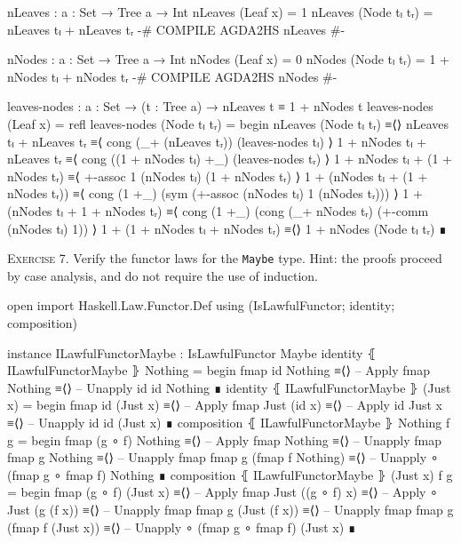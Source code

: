 \documentclass{article}
\begin{document}
\begin{code}
nLeaves : {a : Set} → Tree a → Int
nLeaves (Leaf x) = 1
nLeaves (Node tₗ tᵣ) = nLeaves tₗ + nLeaves tᵣ
{-# COMPILE AGDA2HS nLeaves #-}

nNodes : {a : Set} → Tree a → Int
nNodes (Leaf x) = 0
nNodes (Node tₗ tᵣ) = 1 + nNodes tₗ + nNodes tᵣ
{-# COMPILE AGDA2HS nNodes #-}

leaves-nodes : {a : Set} → (t : Tree a)
    → nLeaves t ≡ 1 + nNodes t
leaves-nodes (Leaf x) = refl
leaves-nodes (Node tₗ tᵣ) =
  begin
    nLeaves (Node tₗ tᵣ)
  ≡⟨⟩
    nLeaves tₗ + nLeaves tᵣ
  ≡⟨ cong (_+ (nLeaves tᵣ)) (leaves-nodes tₗ) ⟩
    1 + nNodes tₗ + nLeaves tᵣ
  ≡⟨ cong ((1 + nNodes tₗ) +_) (leaves-nodes tᵣ) ⟩
    1 + nNodes tₗ + (1 + nNodes tᵣ)
  ≡⟨ +-assoc 1 (nNodes tₗ) (1 + nNodes tᵣ) ⟩
    1 + (nNodes tₗ + (1 + nNodes tᵣ))
  ≡⟨ cong (1 +_) (sym (+-assoc (nNodes tₗ) 1 (nNodes tᵣ))) ⟩
    1 + (nNodes tₗ + 1 + nNodes tᵣ)
  ≡⟨ cong (1 +_) (cong (_+ nNodes tᵣ) (+-comm (nNodes tₗ) 1)) ⟩
    1 + (1 + nNodes tₗ + nNodes tᵣ)
  ≡⟨⟩
    1 + nNodes (Node tₗ tᵣ)
  ∎
\end{code}

\noindent
\textsc{Exercise 7.} Verify the functor laws for the \texttt{Maybe} type. Hint: the proofs proceed by case analysis, and do not require the use of induction.

\begin{code}
open import Haskell.Law.Functor.Def
  using (IsLawfulFunctor; identity; composition)

instance
  ILawfulFunctorMaybe : IsLawfulFunctor Maybe
  identity ⦃ ILawfulFunctorMaybe ⦄ Nothing =
    begin
      fmap id Nothing
    ≡⟨⟩ -- Apply fmap
      Nothing
    ≡⟨⟩ -- Unapply id
      id Nothing
    ∎
  identity ⦃ ILawfulFunctorMaybe ⦄ (Just x) =
    begin
      fmap id (Just x)
    ≡⟨⟩ -- Apply fmap
      Just (id x)
    ≡⟨⟩ -- Apply id
      Just x
    ≡⟨⟩ -- Unapply id
      id (Just x)
    ∎
  composition ⦃ ILawfulFunctorMaybe ⦄ Nothing f g =
    begin
      fmap (g ∘ f) Nothing
    ≡⟨⟩ -- Apply fmap
      Nothing
    ≡⟨⟩ -- Unapply fmap
      fmap g Nothing
    ≡⟨⟩ -- Unapply fmap
      fmap g (fmap f Nothing)
    ≡⟨⟩ -- Unapply ∘
      (fmap g ∘ fmap f) Nothing
    ∎
  composition ⦃ ILawfulFunctorMaybe ⦄ (Just x) f g =
    begin
      fmap (g ∘ f) (Just x)
    ≡⟨⟩ -- Apply fmap
      Just ((g ∘ f) x)
    ≡⟨⟩ -- Apply ∘
      Just (g (f x))
    ≡⟨⟩ -- Unapply fmap
      fmap g (Just (f x))
    ≡⟨⟩ -- Unapply fmap
      fmap g (fmap f (Just x))
    ≡⟨⟩ -- Unapply ∘
      (fmap g ∘ fmap f) (Just x)
    ∎
\end{code}
\end{document}
